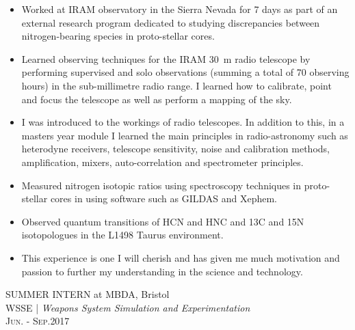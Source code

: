 \documentclass[a4paper,10pt]{article}
\begin{document}
\begin{itemize}[leftmargin=*,topsep=0pt,noitemsep,parsep=0pt,partopsep=0pt,rightmargin=0.2cm]
\setlength\itemsep{0em}

 \item Worked at IRAM observatory in the Sierra Nevada for 7 days as part of an external research program dedicated to studying discrepancies between nitrogen-bearing species in proto-stellar cores. 
 
 \item Learned observing techniques for the IRAM 30~m radio telescope by performing supervised and solo observations (summing a total of 70 observing hours) in the sub-millimetre radio range. I learned how to calibrate, point and focus the telescope as well as perform a mapping of the sky. 
 
 \item I was introduced to the workings of radio telescopes. In addition to this, in a masters year module I learned the main principles in radio-astronomy such as heterodyne receivers, telescope sensitivity, noise and calibration methods, amplification, mixers, auto-correlation and spectrometer principles.
 
 \item Measured nitrogen isotopic ratios using spectroscopy techniques in proto-stellar cores in using software such as GILDAS and Xephem.
 
 \item Observed quantum transitions of HCN and HNC and 13C and 15N isotopologues in the L1498 Taurus environment. 
 
 \item This experience is one I will cherish and has given me much motivation and passion to further my understanding in the science and technology.
 
\end{itemize}

SUMMER INTERN at MBDA, Bristol\\
WSSE | \small\emph{Weapons System Simulation and Experimentation} \\
\textsc{Jun. - Sep.}\textsc{2017}
\end{document}
